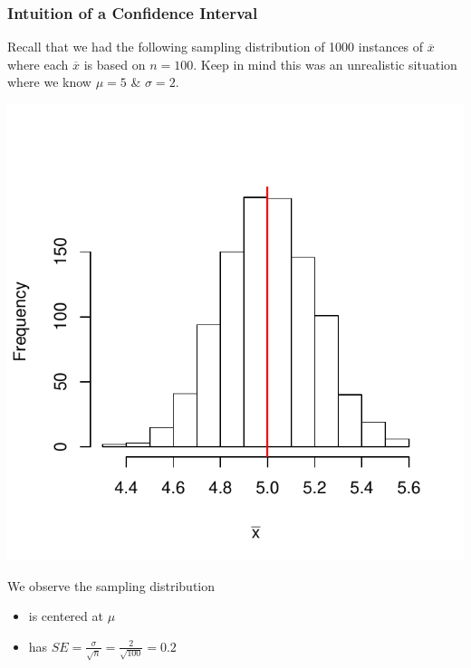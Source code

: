 \documentclass[handout]{beamer}
\newcommand{\blue}[1]{\textcolor{blue2}{#1}}
\newcommand{\xbar}{\overline{x}}
\begin{document}
\begin{frame}[fragile]
\frametitle{Intuition of a Confidence Interval}

Recall that we had the following sampling distribution of 1000 instances of $\xbar$ where each $\xbar$ is based on $n=100$.  Keep in mind this was an unrealistic situation where we \blue{know} $\mu=5$ \& $\sigma=2$.  

\begin{center}
\includegraphics{figure/lec12-001}
\end{center}

We observe the sampling distribution
\begin{itemize}
\item is centered at $\mu$
\item has $SE = \frac{\sigma}{\sqrt n} = \frac{2}{\sqrt{100}} = 0.2$
\end{itemize}

\end{frame}
\end{document}

